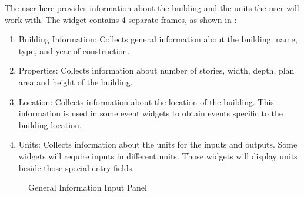 The user here provides information about the building and the units
the user will work with. The widget contains 4 separate frames,
as shown in :

\begin{enumerate}
\item Building Information: Collects general information about the building: name, type, and year of construction.
\item Properties: Collects information about number of stories, width, depth, plan area and height of the building.
\item Location: Collects information about the location of the building. This information is used in some event widgets to obtain events specific to the building location.
\item Units: Collects information about the units for the inputs and outputs. Some widgets will require inputs in different units. Those widgets will display units beside those special entry fields.
\end{enumerate}

\begin{figure}[!htbp]
  \caption{General Information Input Panel}
  \label{fig:gi_overview}
\end{figure}

